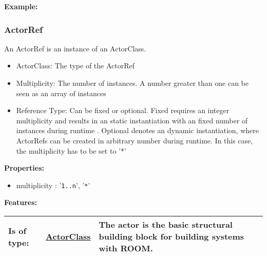 	\textbf{Example:}
	
		
	
	\vspace{\baselineskip}
	\vspace{\baselineskip}
	\vspace{\baselineskip}
	
\subsubsection{ActorRef}
	\hypertarget{ref:ActorRef}{}
	An ActorRef is an instance of an ActorClass.
		
	\begin{itemize}
		\item ActorClass: The type of the ActorRef
		\item Multiplicity: The number of instances. A number greater than one can be seen as an array of instances
		\item Reference Type: Can be fixed or optional. Fixed requires an integer multiplicity and results in an static instantiation with an fixed number of instances during runtime . Optional denotes an dynamic instantiation, where ActorRefs can be created in arbitrary number during runtime. In this case, the multiplicity has to be set to '*'
	\end{itemize}
		
	\textbf{Properties:}
	\begin{itemize}
	\item multiplicity : '\verb|1..n|', '\verb|*|'
	\end{itemize}
		
	\begingroup
	\textbf{Features:}
	\renewcommand{\arraystretch}{1.8} %
	\begin{longtable}{l|l p{}}
		\hline
	Is of type: & \tabitem \hyperlink{ref:ActorClass}{ActorClass}  & The actor is the basic structural building block for building systems with ROOM.\\
	\hline
	\end{longtable}
	\endgroup
		
